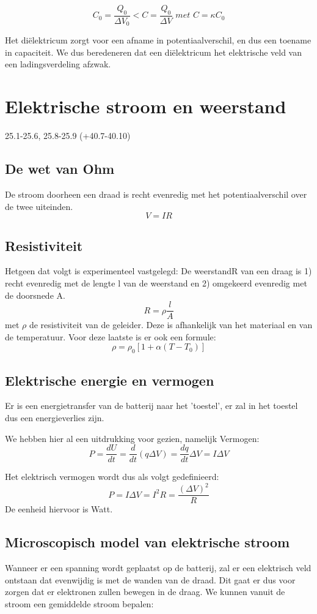 \documentclass[12pt,a4paper]{article}
\begin{document}
    $$C_{0} = \frac{Q_{0}}{\Delta V_{0}} < C = \frac{Q_{0}}{\Delta V} \textit{ met } C = \kappa C_{0}$$
    
    Het diëlektricum zorgt voor een afname in potentiaalverschil, en dus een toename in capaciteit. We dus beredeneren 
    dat een diëlektricum het elektrische veld van een ladingsverdeling afzwak. 
    

    \section{Elektrische stroom en weerstand}
    25.1-25.6, 25.8-25.9 (+40.7-40.10)
    \subsection{De wet van Ohm}
    De stroom doorheen een draad is recht evenredig met het potentiaalverschil over de twee uiteinden.
    \[V = IR\]
    
    \subsection{Resistiviteit}
    Hetgeen dat volgt is experimenteel vastgelegd:
    De weerstandR van een draag is 1) recht evenredig met de lengte l van de weerstand en 2) omgekeerd evenredig met de doorsnede A.
    \[R = \rho\frac{l}{A}\]
    met $\rho$ de resistiviteit van de geleider. Deze is afhankelijk van het materiaal en van de temperatuur. Voor deze laatste is er ook een formule: 
    \[\rho = \rho_0[1 + \alpha (T - T_0)]\]
    
    \subsection{Elektrische energie en vermogen}
    Er is een energietransfer van de batterij naar het 'toestel', er zal in het toestel dus een energieverlies zijn. 
    
    We hebben hier al een uitdrukking voor gezien, namelijk Vermogen: 
    \[P = \frac{dU}{dt} = \frac{d}{dt}(q\Delta V) = \frac{dq}{dt}\Delta V = I\Delta V\]
    
    Het elektrisch vermogen wordt dus als volgt gedefinieerd: 
    \[P = I\Delta V = I^2R = \frac{(\Delta V)^2}{R}\]
    De eenheid hiervoor is Watt.
    
    \subsection{Microscopisch model van elektrische stroom}
    Wanneer er een spanning wordt geplaatst op de batterij, zal er een elektrisch veld ontstaan dat evenwijdig is met de wanden van de draad. Dit gaat er dus voor zorgen dat er elektronen zullen bewegen in de draag. We kunnen vanuit de stroom een gemiddelde stroom bepalen: 
    
\end{document}
